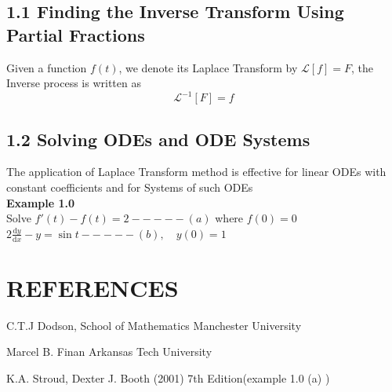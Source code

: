 \documentclass[12pt]{report}
\newcommand{\bt}[1]{\textbf{#1}}
\newcommand{\sps}{\\[0.2cm]}
\newcommand{\dsp}{\displaystyle}
\newcommand{\sprime}{'}
\newcommand{\laplace}[1]{\mathcal{L}[#1]}
\newcommand{\inverseLaplace}[1]{\mathcal{L}^{-1}[#1]}
\begin{document}
	\subsection*{1.1 Finding the Inverse Transform Using Partial Fractions}
	Given a function $f(t)$, we denote its Laplace Transform by $\laplace{f} = F$, the Inverse process is written as
	\begin{equation*}
		\inverseLaplace{F} = f
	\end{equation*}
	\vspace{1cm}
	\subsection*{1.2 Solving ODEs and ODE Systems}
	The application of Laplace Transform method is effective for linear ODEs with constant coefficients and for Systems of such ODEs\sps
	\bt{Example 1.0}\sps
	Solve $f\sprime(t) - f(t) = 2 ----- (a)$ where $f(0)=0$\sps
	$\dsp 2\frac{\mathrm{d}y}{\mathrm{d}x} - y = \sin t ----- (b), \quad y(0) = 1$\sps
	
	\vspace{3cm}
	\section*{REFERENCES}
	\begin{description}
		\item C.T.J Dodson, School of Mathematics Manchester University
		
		\item Marcel B. Finan Arkansas Tech University
		
		\item K.A. Stroud, Dexter J. Booth (2001) 7th Edition(example 1.0 (a) )
	\end{description}
	
	
	
	
	
	
	
	
\end{document}
